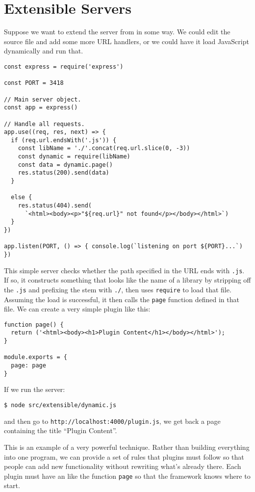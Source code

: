 \chapter{Extensible Servers}\label{s:extensible}

Suppose we want to extend the server from  in some way.
We could edit the source file and add some more URL handlers,
or we could have it load JavaScript dynamically and run that.

\begin{verbatim}
const express = require('express')

const PORT = 3418

// Main server object.
const app = express()

// Handle all requests.
app.use((req, res, next) => {
  if (req.url.endsWith('.js')) {
    const libName = './'.concat(req.url.slice(0, -3))
    const dynamic = require(libName)
    const data = dynamic.page()
    res.status(200).send(data)
  }

  else {
    res.status(404).send(
      `<html><body><p>"${req.url}" not found</p></body></html>`)
  }
})

app.listen(PORT, () => { console.log(`listening on port ${PORT}...`) })
\end{verbatim}

This simple server checks whether the path specified in the URL ends with \texttt{.js}.
If so,
it constructs something that looks like the name of a library by stripping off the \texttt{.js}
and prefixing the stem with \texttt{./},
then uses \texttt{require} to load that file.
Assuming the load is successful,
it then calls the \texttt{page} function defined in that file.
We can create a very simple plugin like this:

\begin{verbatim}
function page() {
  return ('<html><body><h1>Plugin Content</h1></body></html>');
}

module.exports = {
  page: page
}
\end{verbatim}

If we run the server:

\begin{verbatim}
$ node src/extensible/dynamic.js
\end{verbatim}

\noindent
and then go to \texttt{http://localhost:4000/plugin.js},
we get back a page containing the title ``Plugin Content''.

This is an example of a very powerful technique.
Rather than building everything into one program,
we can provide a set of rules that plugins must follow
so that people can add new functionality without rewriting what's already there.
Each plugin must have an  like the function \texttt{page}
so that the framework knows where to start.
